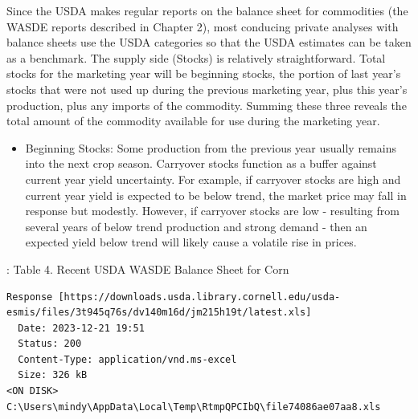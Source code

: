 \documentclass[
  letterpaper,
  DIV=11,
  numbers=noendperiod]{scrreprt}
\providecommand{\tightlist}{%
  \setlength{\itemsep}{0pt}\setlength{\parskip}{0pt}}\usepackage{longtable,booktabs,array}
\begin{document}
Since the USDA makes regular reports on the balance sheet for
commodities (the WASDE reports described in Chapter 2), most conducing
private analyses with balance sheets use the USDA categories so that the
USDA estimates can be taken as a benchmark. The supply side (Stocks) is
relatively straightforward. Total stocks for the marketing year will be
beginning stocks, the portion of last year's stocks that were not used
up during the previous marketing year, plus this year's production, plus
any imports of the commodity. Summing these three reveals the total
amount of the commodity available for use during the marketing year.

\begin{itemize}
\tightlist
\item
  Beginning Stocks: Some production from the previous year usually
  remains into the next crop season. Carryover stocks function as a
  buffer against current year yield uncertainty. For example, if
  carryover stocks are high and current year yield is expected to be
  below trend, the market price may fall in response but modestly.
  However, if carryover stocks are low - resulting from several years of
  below trend production and strong demand - then an expected yield
  below trend will likely cause a volatile rise in prices.
\end{itemize}

: Table 4. Recent USDA WASDE Balance Sheet for Corn

\begin{verbatim}
Response [https://downloads.usda.library.cornell.edu/usda-esmis/files/3t945q76s/dv140m16d/jm215h19t/latest.xls]
  Date: 2023-12-21 19:51
  Status: 200
  Content-Type: application/vnd.ms-excel
  Size: 326 kB
<ON DISK>  C:\Users\mindy\AppData\Local\Temp\RtmpQPCIbQ\file74086ae07aa8.xls
\end{verbatim}
\end{document}
